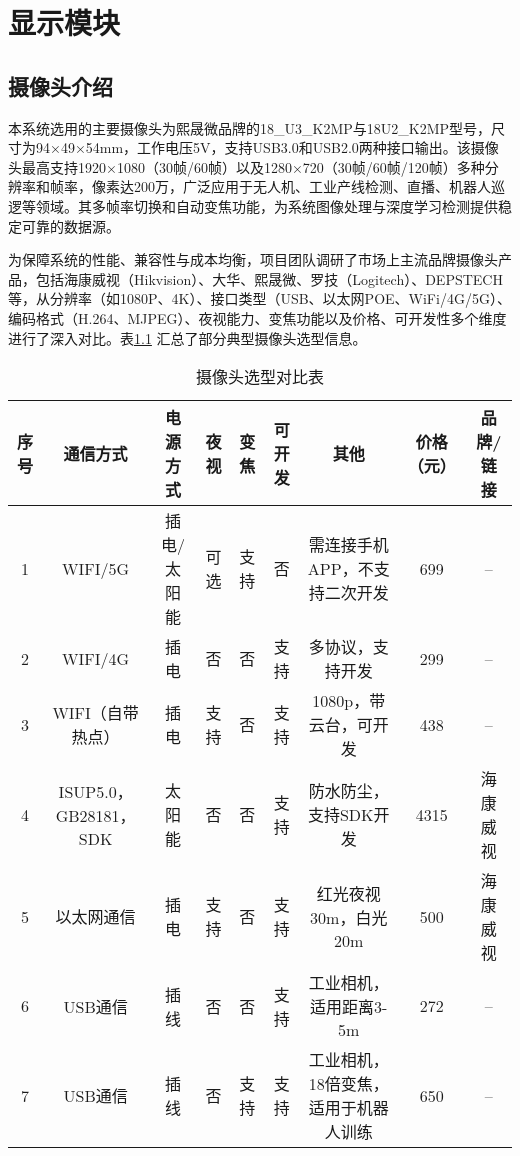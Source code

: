 \chapter{显示模块}

\section{摄像头介绍}

本系统选用的主要摄像头为熙晟微品牌的18\_U3\_K2MP与18U2\_K2MP型号，尺寸为94×49×54mm，工作电压5V，支持USB3.0和USB2.0两种接口输出。该摄像头最高支持1920×1080（30帧/60帧）以及1280×720（30帧/60帧/120帧）多种分辨率和帧率，像素达200万，广泛应用于无人机、工业产线检测、直播、机器人巡逻等领域。其多帧率切换和自动变焦功能，为系统图像处理与深度学习检测提供稳定可靠的数据源。

为保障系统的性能、兼容性与成本均衡，项目团队调研了市场上主流品牌摄像头产品，包括海康威视（Hikvision）、大华、熙晟微、罗技（Logitech）、DEPSTECH 等，从分辨率（如1080P、4K）、接口类型（USB、以太网POE、WiFi/4G/5G）、编码格式（H.264、MJPEG）、夜视能力、变焦功能以及价格、可开发性多个维度进行了深入对比。表\ref{tab:camera_comparison} 汇总了部分典型摄像头选型信息。

\begin{table}[H]
    \centering
    \caption{摄像头选型对比表}
    \label{tab:camera_comparison}
    \begin{tabular}{|c|c|c|c|c|c|c|c|c|}
        \hline
        序号 & 通信方式 & 电源方式 & 夜视 & 变焦 & 可开发 & 其他 & 价格（元） & 品牌/链接 \\
        \hline
        1 & WIFI/5G & 插电/太阳能 & 可选 & 支持 & 否 & 需连接手机APP，不支持二次开发 & 699 & -- \\
        \hline
        2 & WIFI/4G & 插电 & 否 & 否 & 支持 & 多协议，支持开发 & 299 & -- \\
        \hline
        3 & WIFI（自带热点） & 插电 & 支持 & 否 & 支持 & 1080p，带云台，可开发 & 438 & -- \\
        \hline
        4 & ISUP5.0，GB28181，SDK & 太阳能 & 否 & 否 & 支持 & 防水防尘，支持SDK开发 & 4315 & 海康威视 \\
        \hline
        5 & 以太网通信 & 插电 & 支持 & 否 & 支持 & 红光夜视30m，白光20m & 500 & 海康威视 \\
        \hline
        6 & USB通信 & 插线 & 否 & 否 & 支持 & 工业相机，适用距离3-5m & 272 & -- \\
        \hline
        7 & USB通信 & 插线 & 否 & 支持 & 支持 & 工业相机，18倍变焦，适用于机器人训练 & 650 & -- \\
        \hline
    \end{tabular}
\end{table}

